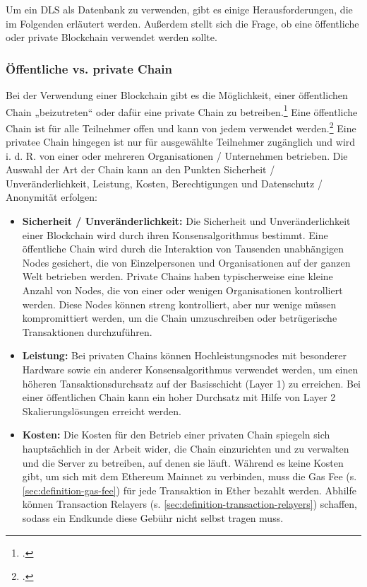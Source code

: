 \documentclass[12pt, a4paper]{article}
\begin{document}
{\noindent
Um ein DLS als Datenbank zu verwenden, gibt es einige Herausforderungen, die im Folgenden erläutert werden.
Außerdem stellt sich die Frage, ob eine öffentliche oder private Blockchain verwendet werden sollte.
\noindent

\subsubsection{Öffentliche vs. private Chain}
\label{sec:oeffentlich-vs-privates-netzwerk}

Bei der Verwendung einer Blockchain gibt es die Möglichkeit, einer öffentlichen Chain „beizutreten“ oder dafür eine private Chain zu betreiben.\footcite[Vgl.][]{w10}
Eine öffentliche Chain ist für alle Teilnehmer offen und kann von jedem verwendet werden.\footcite[Vgl. hierzu und zum Folgenden][]{w11}
Eine privatee Chain hingegen ist nur für ausgewählte Teilnehmer zugänglich und wird i. d. R. von einer oder mehreren Organisationen / Unternehmen betrieben.
Die Auswahl der Art der Chain kann an den Punkten Sicherheit / Unveränderlichkeit, Leistung, Kosten, Berechtigungen und Datenschutz / Anonymität erfolgen:
\begin{itemize}
    \item \textbf{Sicherheit / Unveränderlichkeit:} 
    Die Sicherheit und Unveränderlichkeit einer Blockchain wird durch ihren Konsensalgorithmus bestimmt. 
    Eine öffentliche Chain wird durch die Interaktion von Tausenden unabhängigen Nodes gesichert, die von Einzelpersonen und Organisationen auf der ganzen Welt betrieben werden. 
    Private Chains haben typischerweise eine kleine Anzahl von Nodes, die von einer oder wenigen Organisationen kontrolliert werden. 
    Diese Nodes können streng kontrolliert, aber nur wenige müssen kompromittiert werden, um die Chain umzuschreiben oder betrügerische Transaktionen durchzuführen.

    \item \textbf{Leistung:} 
    Bei privaten Chains können Hochleistungsnodes mit besonderer Hardware sowie ein anderer Konsensalgorithmus verwendet werden, um einen höheren Tansaktionsdurchsatz auf der Basisschicht (Layer 1) zu erreichen.
    Bei einer öffentlichen Chain kann ein hoher Durchsatz mit Hilfe von Layer 2 Skalierungslösungen erreicht werden.

    \item  \textbf{Kosten:}
    Die Kosten für den Betrieb einer privaten Chain spiegeln sich hauptsächlich in der Arbeit wider, die Chain einzurichten und zu verwalten und die Server zu betreiben, auf denen sie läuft. 
    Während es keine Kosten gibt, um sich mit dem Ethereum Mainnet zu verbinden, muss die Gas Fee (s. \ref{sec:definition-gas-fee}) für jede Transaktion in Ether bezahlt werden.
    Abhilfe können Transaction Relayers (s. \ref{sec:definition-transaction-relayers}) schaffen, sodass ein Endkunde diese Gebühr nicht selbst tragen muss.


\end{itemize}}
\end{document}
